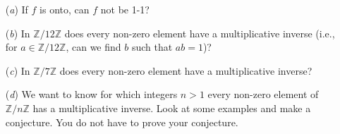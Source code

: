 \documentclass[12pt,letterpaper,boxed]{hmcpset}
\begin{document}
\begin{solution}
\end{solution}

\clearpage

\begin{problem}[1.3.1]
\begin{itemize}
  \item[(\textit{a})] If $ f $ is onto, can $ f $ not be 1-1?
  
  \item[(\textit{b})] In $ \mathbb{Z}/12\mathbb{Z} $ does every non-zero element have a multiplicative inverse (i.e., for $ a \in \mathbb{Z}/12\mathbb{Z} $, can we find $ b $ such that $ ab = 1 $)?
  
  \item[(\textit{c})] In $ \mathbb{Z}/7\mathbb{Z} $ does every non-zero element have a multiplicative inverse? 
  
  \item[(\textit{d})] We want to know for which integers $ n > 1 $ every non-zero element of $ \mathbb{Z}/n\mathbb{Z} $ has a multiplicative inverse. Look at some examples and make a conjecture. You do not have to prove your conjecture. 
\end{itemize}
\end{problem}

\begin{solution}

\end{solution}
\end{document}

